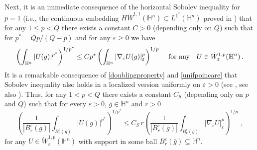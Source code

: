 \documentclass[10pt]{amsart}
\numberwithin{equation}{section}
\theoremstyle{definition}
\newcommand{\He}{\mathbb{H}}
\begin{document}
Next, it is an immediate consequence of the horizontal Sobolev inequality for $p=1$ (i.e., the continuous embedding $H\dot{W}^{1,1} (\mathbb{H}^n)\subset L^{1^*}(\mathbb{H}^n)$ proved in \cite[Theorem 1.1]{CapDanGar2}) that for any $1\leq p <Q$ there exists a constant $C>0$ (depending only on $Q$) such that for $p^*=Qp/(Q-p)$ and for any $\varepsilon \geq 0$ we have 
\begin{equation}
\label{unifsobolev}
	\left(\int_{\He^n} |U(g)|^{p^*} \right)^{1/p^*} \leq C p^* \left( \int_{\He^n} | \nabla_\varepsilon U(g)|^p_\varepsilon  \right)^{1/p}\, \quad \hbox{for any} \quad U \in \dot{W}^{1,p}_\varepsilon (\He^n) \, . 
\end{equation}
It is a remarkable consequence of \eqref{doublingproperty} and \eqref{unifpoincare} that Sobolev inequality also holds in a localized version uniformly on $\varepsilon >0$ (see \cite[Theorem 4.6]{DoMaRi}, see also \cite[Lemma 7.4]{CapoCitti3}). Thus, 
  for any $1<p<Q$ there exists a constant $C_S$ (depending only on $p$ and $Q$) such that for every $\varepsilon >0$, $\bar{g} \in  \He^n$ and $r>0$ 
  \begin{equation}
\label{uniflocalsobolev}
	\left(\frac{1}{|B^\varepsilon_r(\bar{g})|}\int_{B^\varepsilon_r(\bar{g})} |U(g)|^{p^*} \right)^{1/p^*} \leq C_S \, r  \left( \frac{1}{|B^\varepsilon_r(\bar{g})|}\int_{B^\varepsilon_r(\bar{g})} | \nabla_\varepsilon U|^p_\varepsilon  \right)^{1/p}\, \, ,
\end{equation}
for any $U \in \dot{W}^{1,p}_\varepsilon (\He^n)$
with support in some ball $B^\varepsilon_r(\bar{g}) \subseteq \He^n$. 
\end{document}
